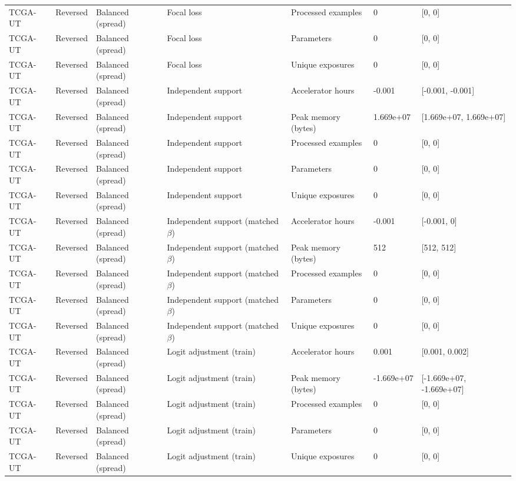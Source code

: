 \begin{longtable}{lllllll}
TCGA-UT & Reversed & Balanced (spread) & Focal loss & Processed examples & 0 & [0, 0] \\
TCGA-UT & Reversed & Balanced (spread) & Focal loss & Parameters & 0 & [0, 0] \\
TCGA-UT & Reversed & Balanced (spread) & Focal loss & Unique exposures & 0 & [0, 0] \\
TCGA-UT & Reversed & Balanced (spread) & Independent support & Accelerator hours & -0.001 & [-0.001, -0.001] \\
TCGA-UT & Reversed & Balanced (spread) & Independent support & Peak memory (bytes) & 1.669e+07 & [1.669e+07, 1.669e+07] \\
TCGA-UT & Reversed & Balanced (spread) & Independent support & Processed examples & 0 & [0, 0] \\
TCGA-UT & Reversed & Balanced (spread) & Independent support & Parameters & 0 & [0, 0] \\
TCGA-UT & Reversed & Balanced (spread) & Independent support & Unique exposures & 0 & [0, 0] \\
TCGA-UT & Reversed & Balanced (spread) & Independent support (matched $\beta$) & Accelerator hours & -0.001 & [-0.001, 0] \\
TCGA-UT & Reversed & Balanced (spread) & Independent support (matched $\beta$) & Peak memory (bytes) & 512 & [512, 512] \\
TCGA-UT & Reversed & Balanced (spread) & Independent support (matched $\beta$) & Processed examples & 0 & [0, 0] \\
TCGA-UT & Reversed & Balanced (spread) & Independent support (matched $\beta$) & Parameters & 0 & [0, 0] \\
TCGA-UT & Reversed & Balanced (spread) & Independent support (matched $\beta$) & Unique exposures & 0 & [0, 0] \\
TCGA-UT & Reversed & Balanced (spread) & Logit adjustment (train) & Accelerator hours & 0.001 & [0.001, 0.002] \\
TCGA-UT & Reversed & Balanced (spread) & Logit adjustment (train) & Peak memory (bytes) & -1.669e+07 & [-1.669e+07, -1.669e+07] \\
TCGA-UT & Reversed & Balanced (spread) & Logit adjustment (train) & Processed examples & 0 & [0, 0] \\
TCGA-UT & Reversed & Balanced (spread) & Logit adjustment (train) & Parameters & 0 & [0, 0] \\
TCGA-UT & Reversed & Balanced (spread) & Logit adjustment (train) & Unique exposures & 0 & [0, 0] \\

\end{longtable}

